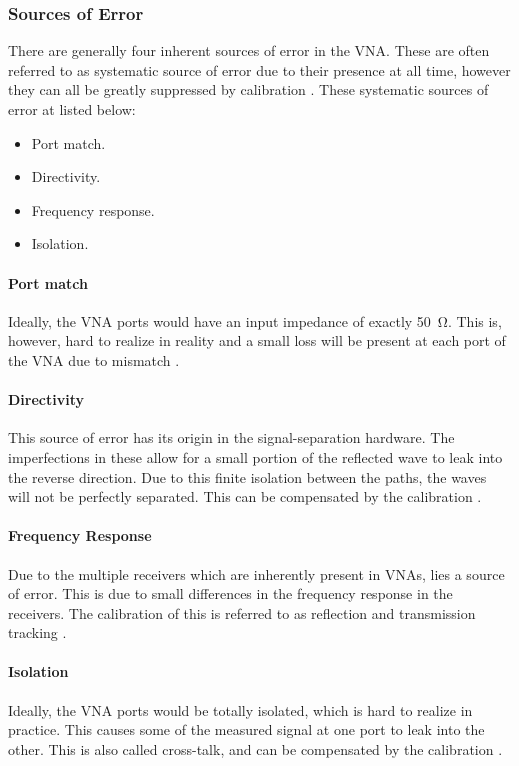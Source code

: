 \subsubsection{Sources of Error}
\label{sec:vnaerrorsource}
There are generally four inherent sources of error in the VNA. These are often referred to as systematic source of error due to their presence at all time, however they can all be greatly suppressed by calibration \cite{nationalInstruVNA}. These systematic sources of error at listed below: 
\begin{itemize}
\item Port match.
\item Directivity.
\item Frequency response.
\item Isolation.
\end{itemize}

\paragraph{Port match} Ideally, the VNA ports would have an input impedance of exactly \SI{50}{\ohm}. This is, however, hard to realize in reality and a small loss will be present at each port of the VNA due to mismatch \cite{nationalInstruVNA}.

\paragraph{Directivity} This source of error has its origin in the signal-separation hardware. The imperfections in these allow for a small portion of the reflected wave to leak into the reverse direction. Due to this finite isolation between the paths, the waves will not be perfectly separated. This can be compensated by the calibration \cite{nationalInstruVNA}. 

\paragraph{Frequency Response} Due to the multiple receivers which are inherently present in VNAs, lies a source of error. This is due to small differences in the frequency response in the receivers. The calibration of this is referred to as reflection and transmission tracking \cite{nationalInstruVNA}.
   
\paragraph{Isolation} Ideally, the VNA ports would be totally isolated, which is hard to realize in practice. This causes some of the measured signal at one port to leak into the other. This is also called cross-talk, and can be compensated by the calibration \cite{nationalInstruVNA}.

